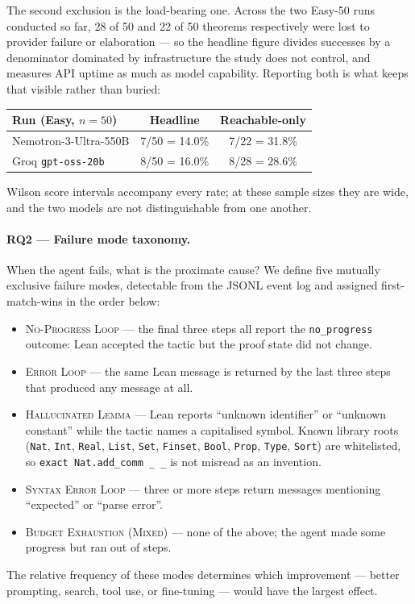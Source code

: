 The second exclusion is the load-bearing one.
Across the two Easy-50 runs conducted so far, 28 of 50 and 22 of 50 theorems
respectively were lost to provider failure or elaboration --- so the headline figure
divides successes by a denominator dominated by infrastructure the study does not
control, and measures API uptime as much as model capability.
Reporting both is what keeps that visible rather than buried:

\begin{center}
\begin{tabular}{@{}lcc@{}}
\hline
\textbf{Run (Easy, $n=50$)} & \textbf{Headline} & \textbf{Reachable-only} \\
\hline
Nemotron-3-Ultra-550B & 7/50 = 14.0\% & 7/22 = 31.8\% \\
Groq \texttt{gpt-oss-20b} & 8/50 = 16.0\% & 8/28 = 28.6\% \\
\hline
\end{tabular}
\end{center}

Wilson score intervals accompany every rate; at these sample sizes they are wide, and
the two models are not distinguishable from one another.

\paragraph{RQ2 --- Failure mode taxonomy.}
When the agent fails, what is the proximate cause?
We define five mutually exclusive failure modes, detectable from the JSONL event log
and assigned first-match-wins in the order below:
\begin{itemize}
  \item \textsc{No-Progress Loop} --- the final three steps all report the
        \texttt{no\_progress} outcome: Lean accepted the tactic but the proof state
        did not change.
  \item \textsc{Error Loop} --- the same Lean message is returned by the last three
        steps that produced any message at all.
  \item \textsc{Hallucinated Lemma} --- Lean reports ``unknown identifier'' or
        ``unknown constant'' while the tactic names a capitalised symbol. Known
        library roots (\texttt{Nat}, \texttt{Int}, \texttt{Real}, \texttt{List},
        \texttt{Set}, \texttt{Finset}, \texttt{Bool}, \texttt{Prop}, \texttt{Type},
        \texttt{Sort}) are whitelisted, so \texttt{exact Nat.add\_comm \_ \_} is not
        misread as an invention.
  \item \textsc{Syntax Error Loop} --- three or more steps return messages mentioning
        ``expected'' or ``parse error''.
  \item \textsc{Budget Exhaustion (Mixed)} --- none of the above;
        the agent made some progress but ran out of steps.
\end{itemize}
The relative frequency of these modes determines which improvement ---
better prompting, search, tool use, or fine-tuning --- would have the largest effect.

